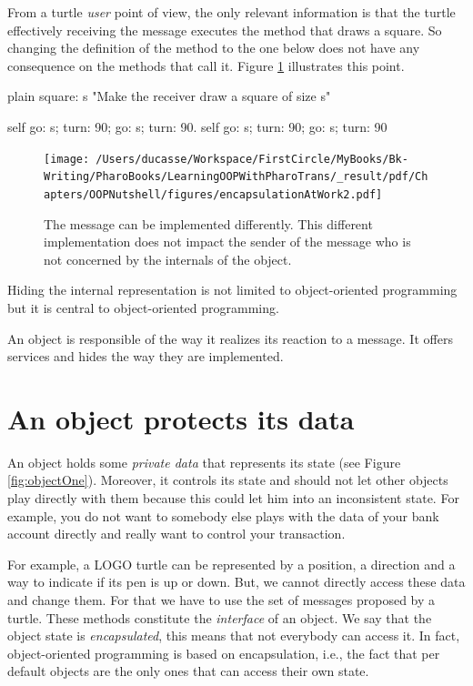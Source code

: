 \documentclass[10pt,twoside,english]{_support/latex/sbabook/sbabook}
\begin{document}
From a turtle \textit{user} point of view, the only relevant information is that the turtle effectively receiving the message  executes the method that draws a square. So changing the definition of the  method  to the one below does not have any consequence on the methods that call it. Figure \ref{fig:encapsulationAtWork2} illustrates this point.

\begin{displaycode}{plain}
square: s
   "Make the receiver draw a square of size s"

   self go: s; turn: 90; go: s; turn: 90.
   self go: s; turn: 90; go: s; turn: 90
\end{displaycode}


\begin{figure}

\begin{center}
\texttt{[image: /Users/ducasse/Workspace/FirstCircle/MyBooks/Bk-Writing/PharoBooks/LearningOOPWithPharoTrans/\_result/pdf/Chapters/OOPNutshell/figures/encapsulationAtWork2.pdf]}\caption{The message  can be implemented differently. This different implementation does not impact the sender of the message who is not concerned by the internals of the object.\label{fig:encapsulationAtWork2}}\end{center}
\end{figure}


Hiding the internal representation is not limited to object-oriented programming but it is central to object-oriented programming. 

\begin{important}
An object is responsible of the way it realizes its reaction to a message. It offers services and hides the way they are implemented.
\end{important}
\section{An object protects its data}
An object holds some \textit{private data} that represents its state (see Figure \ref{fig:objectOne}). Moreover, it controls its state and should not let other objects play directly with them because this could let him into an inconsistent state.  For example, you do not want to somebody else plays with the data of your bank account directly and really want to control your transaction.

For example, a LOGO turtle can be represented by a position, a direction and a way to indicate if its pen is up or down. But, we cannot directly access these data and change them. For that we have to use the set of messages proposed by a turtle. These methods constitute the \textit{interface} of an object. We say that the object state is \textit{encapsulated}, this means that not everybody can access it. In fact, object-oriented programming is based on encapsulation, i.e., the fact that per default objects are the only ones that can access their own state.
\end{document}
